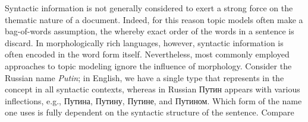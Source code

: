 \documentclass[11pt,letterpaper]{article}
\begin{document}
Syntactic information is not generally considered to exert a strong
force on the thematic nature of a document.  Indeed, for this reason
topic models often make a bag-of-words assumption, the whereby exact
order of the words in a sentence is discard. In morphologically rich
languages, however, syntactic information is often encoded in the word
form itself. Nevertheless, most commonly employed approaches to topic
modeling ignore the influence of morphology. Consider the Russian name
{\em Putin}; in English, we have a single type that represents in the
concept in all syntactic contexts, whereas in Russian
{ Путин} appears with various inflections,
e.g., {Путина},
{Путину}, {Путине},
and {Путином}. Which form of the name one uses
is fully dependent on the syntactic structure of the sentence. Compare
\end{document}

